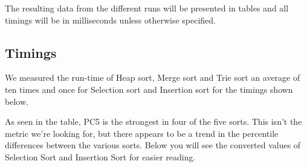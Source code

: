 
The resulting data from the different runs will be presented in tables and all timings will be in milliseconds unless otherwise specified. 

\vspace{0.5cm}
\subsection{Timings}
\label{sec:3.1}

We measured the run-time of Heap sort, Merge sort and Trie sort an average of ten times and once for Selection sort and Insertion sort for the timings shown below.


\begin{table}[H]
\centering

\caption{Timings for each PC}
\label{tab:timings1}
\end{table}

As seen in the table, PC5 is the strongest in four of the five sorts. This isn't the metric we're looking for, but there appears to be a trend in the percentile differences between the various sorts. Below you will see the converted values of Selection Sort and Insertion Sort for easier reading.

